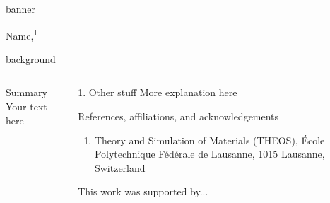 \documentclass{beamer}
\begin{document}
\begin{frame}[t]{}
\begin{beamercolorbox}[wd=\textwidth,sep=1em]{banner}
\begin{center}
            \vspace{1em}
            \large
            Name,\textsuperscript{1}
            \vspace{1em}
        \end{center}
    \end{beamercolorbox}

    \vspace{-0.001\paperheight}
    \begin{beamercolorbox}[ht=0.675\paperheight,wd=\textwidth]{background}

        \begin{columns}[t]
            \begin{column}{0.37\linewidth}
                \begin{block}{Summary}
                    Your text here
                \end{block}

            \end{column}

            \begin{column}{0.57\linewidth}

                \begin{block}{1. Other stuff}
                    More explanation here
                \end{block}

                \begin{block}{References, affiliations, and acknowledgements}
                    \begin{minipage}{0.45\textwidth}
                        \AtNextBibliography{\tiny}
                        \printbibliography
                    \end{minipage}
                    \begin{minipage}{0.575\textwidth}
                        \tiny
                        \begin{enumerate}
                            \item Theory and Simulation of Materials (THEOS), \'Ecole Polytechnique F\'ed\'erale de Lausanne, 1015 Lausanne, Switzerland
                        \end{enumerate}
                        \vspace{1em}
                        This work was supported by...
                    \end{minipage}


\end{block}
\end{column}
\end{columns}
\end{beamercolorbox}
\end{frame}
\end{document}
